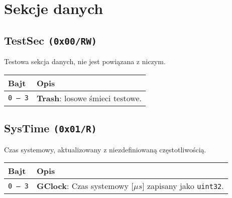 \section{Sekcje danych}
\label{Sec_SekcjeDanych}

\subsection{TestSec \texttt{(0x00/RW)}}
\label{TestSec}
Testowa sekcja danych, nie jest powiązana z niczym.
\begin{longtable}{|p{\BWIDTH}|p{\OWIDTH}|}
	\hline
	\textbf{Bajt} & \textbf{Opis}\\ 
	\hline
	\hline
	\texttt{0 -- 3} & \textbf{Trash}: losowe śmieci testowe.\\
	\hline
\end{longtable}

\subsection{SysTime \texttt{(0x01/R)}}
\label{SysTime}
Czas systemowy, aktualizowany z niezdefiniowaną częstotliwością.
\begin{longtable}{|p{\BWIDTH}|p{\OWIDTH}|}
	\hline
	\textbf{Bajt} & \textbf{Opis}\\ 
	\hline
	\hline
	\texttt{0 -- 3} & \textbf{GClock}: Czas systemowy [$\mu s$] zapisany jako \texttt{uint32}.\\
	\hline
\end{longtable}